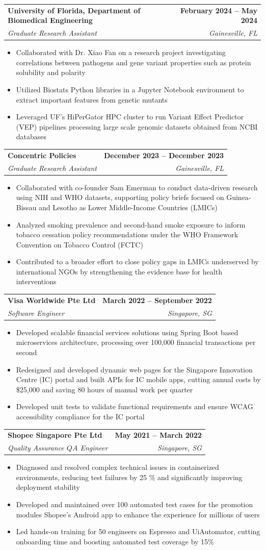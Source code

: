 \documentclass[letterpaper,11pt]{article}
\makeatletter
\newcommand{\resumeItem}[1]{
  \item\small{
    {#1 \vspace{-2pt}}
  }
}
\newcommand{\resumeSubheading}[4]{
  \vspace{-2pt}\item
    \begin{tabular*}{1.0\textwidth}[t]{l@{\extracolsep{\fill}}r}
      \textbf{#1} & \textbf{\small #2} \\
      \textit{\small#3} & \textit{\small #4} \\
    \end{tabular*}
}
\newcommand{\resumeItemListStart}{\begin{itemize}}
\newcommand{\resumeItemListEnd}{\end{itemize}}
\makeatother
\begin{document}
    \resumeSubheading
      {University of Florida, Department of Biomedical Engineering}{February 2024 -- May 2024}
      {Graduate Research Assistant}{Gainesville, FL}
      \resumeItemListStart
        \resumeItem{Collaborated with Dr. Xiao Fan on a research project investigating correlations between pathogens and gene variant properties such as protein solubility and polarity}
        \resumeItem{Utilized Biostats Python libraries in a Jupyter Notebook environment to extract important features from genetic mutants}
        \resumeItem{Leveraged UF’s HiPerGator HPC cluster to run Variant Effect Predictor (VEP) pipelines processing large scale genomic datasets obtained from NCBI databases}
      \resumeItemListEnd

    \resumeSubheading
      {Concentric Policies}{December 2023 -- December 2023}
      {Graduate Research Assistant}{Gainesville, FL}
      \resumeItemListStart
        \resumeItem{Collaborated with co-founder Sam Emerman to conduct data-driven research using NIH and WHO datasets, supporting policy briefs focused on Guinea-Bissau and Lesotho as Lower Middle-Income Countries (LMICs)}
        \resumeItem{Analyzed smoking prevalence and second-hand smoke exposure to inform tobacco cessation policy recommendations under the WHO Framework Convention on Tobacco Control (FCTC)}
        \resumeItem{Contributed to a broader effort to close policy gaps in LMICs underserved by international NGOs by strengthening the evidence base for health interventions}
      \resumeItemListEnd

    \resumeSubheading
      {Visa Worldwide Pte Ltd}{March 2022 -- September 2022}
      {Software Engineer}{Singapore, SG}
      \resumeItemListStart
        \resumeItem{Developed scalable financial services solutions using Spring Boot based microservices architecture, processing over 100,000 financial transactions per second}
        \resumeItem{Redesigned and developed dynamic web pages for the Singapore Innovation Centre (IC) portal and built APIs for IC mobile apps, cutting annual costs by \$25,000 and saving 80 hours of manual work per quarter}
        \resumeItem{Developed unit tests to validate functional requirements and ensure WCAG accessibility compliance for the IC portal}
      \resumeItemListEnd

    \resumeSubheading
      {Shopee Singapore Pte Ltd}{May 2021 -- March 2022}
      {Quality Assurance \(QA\) Engineer}{Singapore, SG}
      \resumeItemListStart
        \resumeItem{Diagnosed and resolved complex technical issues in containerized environments, reducing test failures by 25 \% and significantly improving deployment stability}
        \resumeItem{Developed and maintained over 100 automated test cases for the promotion modules Shopee’s Android app  to enhance the experience for millions of users}
        \resumeItem{Led hands-on training for 50 engineers on Espresso and UiAutomator, cutting onboarding time and boosting automated test coverage by 15\%}
      \resumeItemListEnd
\end{document}
